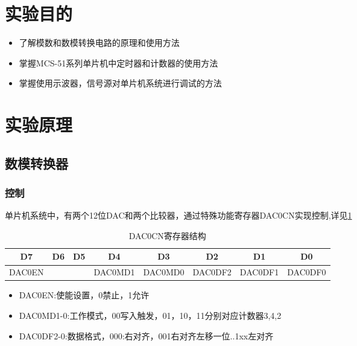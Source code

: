 \begin{spacing}{1.3}  %
\maketitle
\section{实验目的}
\begin{itemize}
	\item 了解模数和数模转换电路的原理和使用方法
	\item 掌握MCS-51系列单片机中定时器和计数器的使用方法
	\item 掌握使用示波器，信号源对单片机系统进行调试的方法
\end{itemize}
\vspace{3mm}

\section{实验原理}
\subsection{数模转换器}
\subsubsection{控制}
单片机系统中，有两个12位DAC和两个比较器，通过特殊功能寄存器DAC0CN实现控制,详见\ref{table_DAC0CN}
\begin{table}[!htbp]
  \centering
  \caption{DAC0CN寄存器结构}
  \label{table_DAC0CN}
\begin{tabular}{|c|c|c|c|c|c|c|c|}
  \hline
  D7&D6&D5&D4&D3&D2&D1&D0\\
    \hline
  DAC0EN&&&DAC0MD1&DAC0MD0&DAC0DF2&DAC0DF1&DAC0DF0\\
  \hline
\end{tabular}
\end{table}
\begin{itemize}
  \item DAC0EN:使能设置，0禁止，1允许
  \item DAC0MD1-0:工作模式，00写入触发，01，10，11分别对应计数器3,4,2
  \item DAC0DF2-0:数据格式，000:右对齐，001右对齐左移一位..1xx左对齐
\end{itemize}

\end{spacing}
